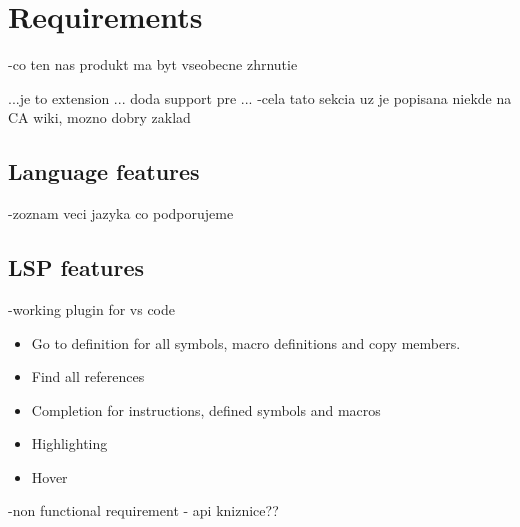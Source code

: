 \chapter{Requirements}

-co ten nas produkt ma byt
vseobecne zhrnutie

...je to extension ... doda support pre ... 
-cela tato sekcia uz je popisana niekde na CA wiki, mozno dobry zaklad

\section{Language features}
-zoznam veci jazyka co podporujeme




\section{LSP features}
-working plugin for vs code

\begin{itemize}
	\item Go to definition for all symbols, macro definitions and copy members.
	\item Find all references
	\item Completion for instructions, defined symbols and macros
	\item Highlighting
	\item Hover
\end{itemize}



-non functional requirement - api kniznice??